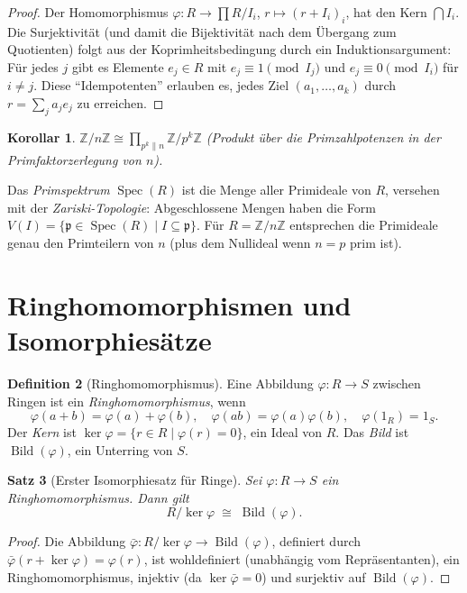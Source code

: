 \documentclass[12pt,a4paper]{amsart}
\newtheorem{theorem}{Satz}[section]
\newtheorem{corollary}[theorem]{Korollar}
\theoremstyle{definition}
\newtheorem{definition}[theorem]{Definition}
\theoremstyle{definition}
\DeclareMathOperator{\Spec}{Spec}
\begin{document}
\begin{proof}
Der Homomorphismus $\varphi\colon R \to \prod R/I_i$, $r \mapsto (r + I_i)_i$, hat
den Kern $\bigcap I_i$. Die Surjektivität (und damit die Bijektivität nach dem Übergang
zum Quotienten) folgt aus der Koprimheitsbedingung durch ein Induktionsargument:
Für jedes $j$ gibt es Elemente $e_j \in R$ mit $e_j \equiv 1 \pmod{I_j}$ und
$e_j \equiv 0 \pmod{I_i}$ für $i \neq j$. Diese ``Idempotenten'' erlauben es,
jedes Ziel $(a_1,\ldots,a_k)$ durch $r = \sum_j a_j e_j$ zu erreichen.
\end{proof}

\begin{corollary}
$\mathbb{Z}/n\mathbb{Z} \cong \prod_{p^k \| n} \mathbb{Z}/p^k\mathbb{Z}$
(Produkt über die Primzahlpotenzen in der Primfaktorzerlegung von $n$).
\end{corollary}

Das \emph{Primspektrum} $\Spec(R)$ ist die Menge aller Primideale von $R$,
versehen mit der \emph{Zariski-Topologie}: Abgeschlossene Mengen haben die Form
$V(I) = \{\mathfrak{p} \in \Spec(R) \mid I \subseteq \mathfrak{p}\}$.
Für $R = \mathbb{Z}/n\mathbb{Z}$ entsprechen die Primideale genau den Primteilern
von $n$ (plus dem Nullideal wenn $n = p$ prim ist).

\section{Ringhomomorphismen und Isomorphiesätze}

\begin{definition}[Ringhomomorphismus]
Eine Abbildung $\varphi\colon R \to S$ zwischen Ringen ist ein \emph{Ringhomomorphismus},
wenn
\[
  \varphi(a+b) = \varphi(a) + \varphi(b),\quad
  \varphi(ab) = \varphi(a)\varphi(b),\quad
  \varphi(1_R) = 1_S.
\]
Der \emph{Kern} ist $\ker\varphi = \{r \in R \mid \varphi(r) = 0\}$, ein Ideal von $R$.
Das \emph{Bild} ist $\operatorname{Bild}(\varphi)$, ein Unterring von $S$.
\end{definition}

\begin{theorem}[Erster Isomorphiesatz für Ringe]
Sei $\varphi\colon R \to S$ ein Ringhomomorphismus. Dann gilt
\[
  R/\ker\varphi \;\cong\; \operatorname{Bild}(\varphi).
\]
\end{theorem}

\begin{proof}
Die Abbildung $\bar\varphi\colon R/\ker\varphi \to \operatorname{Bild}(\varphi)$,
definiert durch $\bar\varphi(r + \ker\varphi) = \varphi(r)$, ist wohldefiniert
(unabhängig vom Repräsentanten), ein Ringhomomorphismus, injektiv
(da $\ker\bar\varphi = 0$) und surjektiv auf $\operatorname{Bild}(\varphi)$.
\end{proof}
\end{document}
